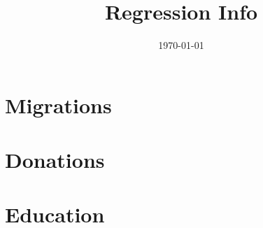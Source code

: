\documentclass[11pt]{article}
\title{Regression Info}
\date{\today}
\begin{document}
\section{Migrations}











\clearpage
\section{Donations}

























%
%

\clearpage
\section{Education}




\end{document}

